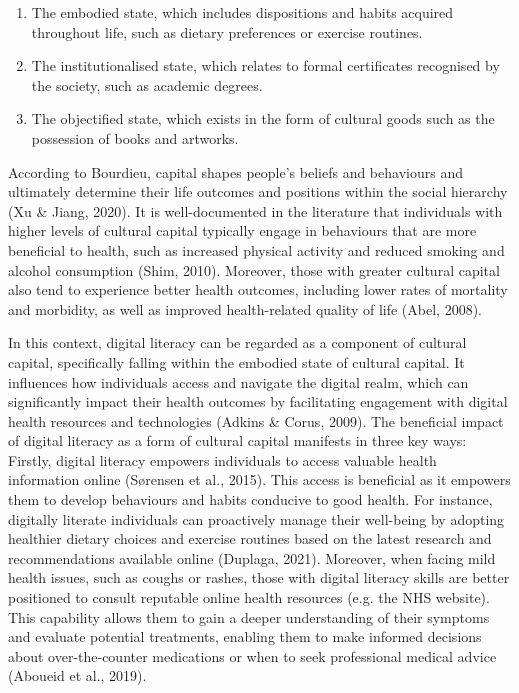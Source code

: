 \begin{enumerate}
    \item The embodied state, which includes dispositions and habits acquired throughout life, such as dietary preferences or exercise routines.
    \item The institutionalised state, which relates to formal certificates recognised by the society, such as academic degrees.
    \item The objectified state, which exists in the form of cultural goods such as the possession of books and artworks.
\end{enumerate}

According to Bourdieu, capital shapes people's beliefs and behaviours and ultimately determine their life outcomes and positions within the social hierarchy (Xu \& Jiang, 2020). It is well-documented in the literature that individuals with higher levels of cultural capital typically engage in behaviours that are more beneficial to health, such as increased physical activity and reduced smoking and alcohol consumption (Shim, 2010). Moreover, those with greater cultural capital also tend to experience better health outcomes, including lower rates of mortality and morbidity, as well as improved health-related quality of life (Abel, 2008).

In this context, digital literacy can be regarded as a component of cultural capital, specifically falling within the embodied state of cultural capital. It influences how individuals access and navigate the digital realm, which can significantly impact their health outcomes by facilitating engagement with digital health resources and technologies (Adkins \& Corus, 2009). The beneficial impact of digital literacy as a form of cultural capital manifests in three key ways: Firstly, digital literacy empowers individuals to access valuable health information online (Sørensen et al., 2015). This access is beneficial as it empowers them to develop behaviours and habits conducive to good health. For instance, digitally literate individuals can proactively manage their well-being by adopting healthier dietary choices and exercise routines based on the latest research and recommendations available online (Duplaga, 2021). Moreover, when facing mild health issues, such as coughs or rashes, those with digital literacy skills are better positioned to consult reputable online health resources (e.g. the NHS website). This capability allows them to gain a deeper understanding of their symptoms and evaluate potential treatments, enabling them to make informed decisions about over-the-counter medications or when to seek professional medical advice (Aboueid et al., 2019).

